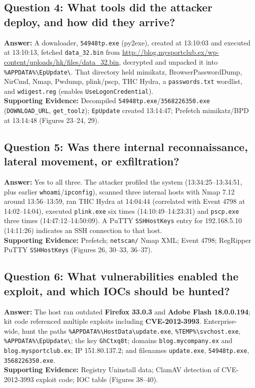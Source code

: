 \documentclass[12pt]{article}
\begin{document}
\subsection*{Question 4: What tools did the attacker deploy, and how did they arrive?}
\textbf{Answer:} A downloader, \texttt{54948tp.exe} (py2exe), created at 13:10:03 and executed at 13:10:13, fetched \texttt{data\_32.bin} from \url{http://blog.mysportclub.ex/wp-content/uploads/hk/files/data_32.bin}, decrypted and unpacked it into \texttt{\%APPDATA\%\textbackslash EpUpdate\textbackslash}. That directory held mimikatz, BrowserPasswordDump, NirCmd, Nmap, Pwdump, plink/pscp, THC Hydra, a \texttt{passwords.txt} wordlist, and \texttt{wdigest.reg} (enables \texttt{UseLogonCredential}).\\
\textbf{Supporting Evidence:} Decompiled \texttt{54948tp.exe}/\texttt{3568226350.exe} (\texttt{DOWNLOAD\_URL}, \texttt{get\_toolz}); \texttt{EpUpdate} created 13:14:47; Prefetch mimikatz/BPD at 13:14:48 (Figures 23--24, 29).

\subsection*{Question 5: Was there internal reconnaissance, lateral movement, or exfiltration?}
\textbf{Answer:} Yes to all three. The attacker profiled the system (13:34:25--13:34:51, plus earlier \texttt{whoami}/\texttt{ipconfig}), scanned three internal hosts with Nmap 7.12 around 13:56--13:59, ran THC Hydra at 14:04:44 (correlated with Event 4798 at 14:02--14:04), executed \texttt{plink.exe} six times (14:10:49--14:23:31) and \texttt{pscp.exe} three times (14:47:12--14:50:09). A PuTTY \texttt{SSHHostKeys} entry for 192.168.5.10 (14:11:26) indicates an SSH connection to that host.\\
\textbf{Supporting Evidence:} Prefetch; \texttt{netscan/} Nmap XML; Event 4798; RegRipper PuTTY \texttt{SSHHostKeys} (Figures 26, 30--33, 36--37).

\subsection*{Question 6: What vulnerabilities enabled the exploit, and which IOCs should be hunted?}
\textbf{Answer:} The host ran outdated \textbf{Firefox 33.0.3} and \textbf{Adobe Flash 18.0.0.194}; kit code referenced multiple exploits including \textbf{CVE-2012-3993}. Enterprise-wide, hunt the paths \texttt{\%APPDATA\%\textbackslash HostData\textbackslash update.exe}, \texttt{\%TEMP\%\textbackslash svchost.exe}, \texttt{\%APPDATA\%\textbackslash EpUpdate\textbackslash}; the key \texttt{GhCtxq8t}; domains \texttt{blog.mycompany.ex} and \texttt{blog.mysportclub.ex}; IP 151.80.137.2; and filenames \texttt{update.exe}, \texttt{54948tp.exe}, \texttt{3568226350.exe}.\\
\textbf{Supporting Evidence:} Registry Uninstall data; ClamAV detection of CVE-2012-3993 exploit code; IOC table (Figures 38--40).
\end{document}
